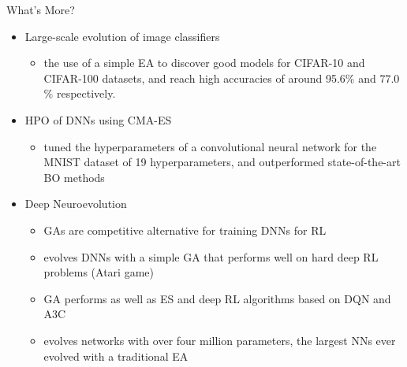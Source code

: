 \begin{frame}{What's More?}
\begin{itemize}
    \item Large-scale evolution of image classifiers 
    \begin{itemize}
        \item the use of a simple EA to discover good models for CIFAR-10 and CIFAR-100 datasets, and reach high accuracies of around 95.6$\%$ and 77.0$\%$ respectively. 
    \end{itemize}
    \item HPO of DNNs using CMA-ES 
    \begin{itemize}
        \item tuned the hyperparameters of a convolutional neural network for the MNIST dataset of 19 hyperparameters, and outperformed state-of-the-art BO methods
    \end{itemize}
    \item Deep Neuroevolution 
    \begin{itemize}
        \item GAs are competitive alternative for training DNNs for RL
        \item evolves DNNs with a simple GA that performs well on hard deep RL problems (Atari game)
        \item GA performs as well as ES and deep RL algorithms based on DQN and A3C
        \item evolves networks with over four million parameters, the largest NNs ever evolved with a traditional EA
    \end{itemize}
\end{itemize}
\end{frame}

